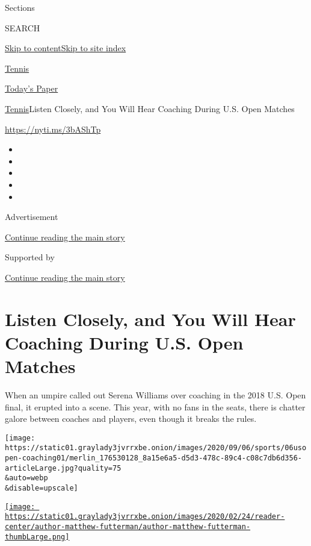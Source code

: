 Sections

SEARCH

\protect\hyperlink{site-content}{Skip to
content}\protect\hyperlink{site-index}{Skip to site index}

\href{https://www.nytimes3xbfgragh.onion/section/sports/tennis}{Tennis}

\href{https://myaccount.nytimes3xbfgragh.onion/auth/login?response_type=cookie\&client_id=vi}{}

\href{https://www.nytimes3xbfgragh.onion/section/todayspaper}{Today's
Paper}

\href{/section/sports/tennis}{Tennis}\textbar{}Listen Closely, and You
Will Hear Coaching During U.S. Open Matches

\url{https://nyti.ms/3bAShTp}

\begin{itemize}
\item
\item
\item
\item
\item
\end{itemize}

Advertisement

\protect\hyperlink{after-top}{Continue reading the main story}

Supported by

\protect\hyperlink{after-sponsor}{Continue reading the main story}

\hypertarget{listen-closely-and-you-will-hear-coaching-during-us-open-matches}{%
\section{Listen Closely, and You Will Hear Coaching During U.S. Open
Matches}\label{listen-closely-and-you-will-hear-coaching-during-us-open-matches}}

When an umpire called out Serena Williams over coaching in the 2018 U.S.
Open final, it erupted into a scene. This year, with no fans in the
seats, there is chatter galore between coaches and players, even though
it breaks the rules.

\texttt{[image: https://static01.graylady3jvrrxbe.onion/images/2020/09/06/sports/06usopen-coaching01/merlin\_176530128\_8a15e6a5-d5d3-478c-89c4-c08c7db6d356-articleLarge.jpg?quality=75\\\&auto=webp\\\&disable=upscale]}

\href{https://www.nytimes3xbfgragh.onion/by/matthew-futterman}{\texttt{[image: https://static01.graylady3jvrrxbe.onion/images/2020/02/24/reader-center/author-matthew-futterman/author-matthew-futterman-thumbLarge.png]}}

